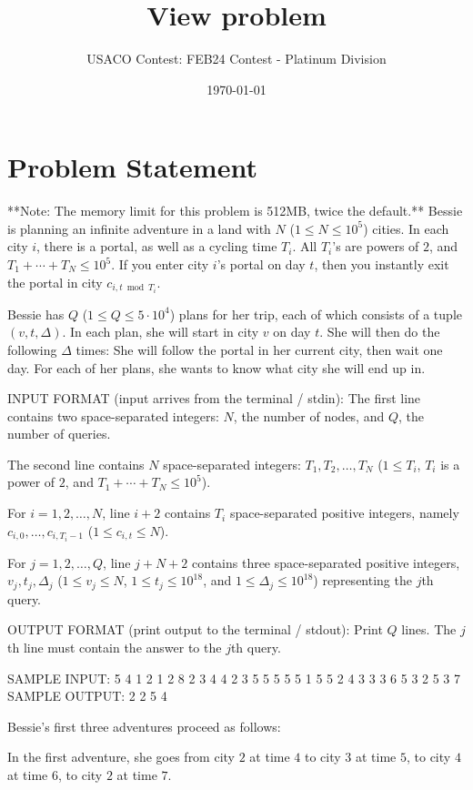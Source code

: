 \documentclass[12pt]{article}
\title{View problem}
\author{USACO Contest: FEB24 Contest - Platinum Division}
\date{\today}
\begin{document}
\maketitle

\section*{Problem Statement}


**Note: The memory limit for this problem is 512MB, twice the default.**
Bessie is planning an infinite adventure in a land with $N$
($1\leq N \leq 10^5$) cities. In each city $i$, there is a portal, as well as a
cycling time $T_i$.  All $T_i$'s are powers of $2$, and
$T_1 + \cdots + T_N \leq 10^5$. If you enter city $i$'s portal on day $t$, then
you instantly exit the portal in city
$c_{i, t\bmod{T_i}}$.

Bessie has $Q$ ($1\leq Q \leq 5\cdot 10^4$) plans for her trip, each of which
consists of a tuple $(v, t, \Delta)$. In each plan, she will start in city $v$
on day $t$. She will then do the following $\Delta$ times: She will follow the
portal in her current city, then wait one day. For each of her plans, she wants
to know what city she will end up in.  

INPUT FORMAT (input arrives from the terminal / stdin):
The first line contains two space-separated integers: $N$, the number of nodes,
and $Q$, the number of queries.

The second line contains $N$ space-separated integers: $T_1, T_2, \ldots, T_N$
($1\leq T_i$, $T_i$ is a power of $2$, and $T_1 + \cdots + T_N \leq 10^5$).

For $i = 1, 2, \ldots, N$, line $i+2$ contains $T_i$ space-separated positive
integers, namely $c_{i, 0}, \ldots, c_{i, T_i-1}$ ($1\leq c_{i, t} \leq N$).

For $j = 1, 2, \ldots, Q$, line $j+N+2$ contains three space-separated positive
integers, $v_j, t_j, \Delta_j$ ($1\leq v_j \leq N$, $1\leq t_j \leq 10^{18}$,
and $1\leq \Delta_j \leq 10^{18}$) representing the $j$th query.

OUTPUT FORMAT (print output to the terminal / stdout):
Print $Q$ lines. The $j$th line must contain the answer to the $j$th query.

SAMPLE INPUT:
5 4
1 2 1 2 8
2
3 4
4
2 3
5 5 5 5 5 1 5 5
2 4 3
3 3 6
5 3 2
5 3 7
SAMPLE OUTPUT: 
2
2
5
4

Bessie's first three adventures proceed as follows:

In the first adventure, she goes from city $2$ at time $4$ to city $3$ at time $5$, to city $4$ at time $6$, to city $2$ at time $7$.
\end{document}
